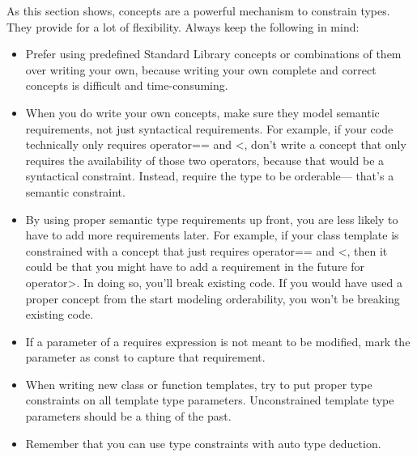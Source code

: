 
As this section shows, concepts are a powerful mechanism to constrain types. They provide for a lot of flexibility. Always keep the following in mind:

\begin{itemize}
\item
Prefer using predefined Standard Library concepts or combinations of them over writing your own, because writing your own complete and correct concepts is difficult and time-consuming.

\item
When you do write your own concepts, make sure they model semantic requirements, not just syntactical requirements. For example, if your code technically only requires operator== and <, don’t write a concept that only requires the availability of those two operators, because that would be a syntactical constraint. Instead, require the type to be orderable— that’s a semantic constraint.

\item
By using proper semantic type requirements up front, you are less likely to have to add more requirements later. For example, if your class template is constrained with a concept that just requires operator== and <, then it could be that you might have to add a requirement in the future for operator>. In doing so, you’ll break existing code. If you would have used a proper concept from the start modeling orderability, you won’t be breaking existing code.

\item
If a parameter of a requires expression is not meant to be modified, mark the parameter as const to capture that requirement.

\item
When writing new class or function templates, try to put proper type constraints on all template type parameters. Unconstrained template type parameters should be a thing of the past.

\item
Remember that you can use type constraints with auto type deduction.
\end{itemize}

















